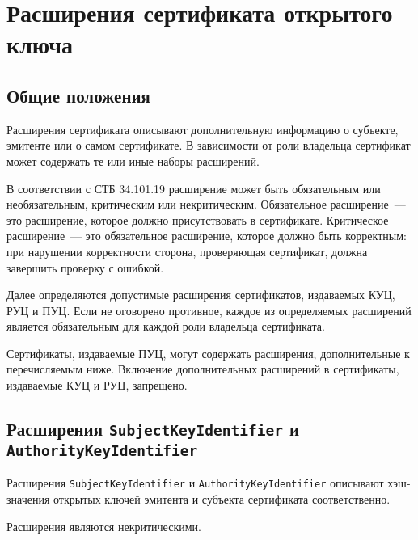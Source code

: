\section{Расширения сертификата открытого ключа}\label{FMT.Ext}

\subsection{Общие положения}\label{FMT.Ext.Intro} 

Расширения сертификата описывают дополнительную информацию о субъекте,
эмитенте или о самом сертификате. В зависимости от роли владельца 
сертификат может содержать те или иные наборы расширений.

В соответствии с СТБ 34.101.19 расширение может быть обязательным или 
необязательным, критическим или некритическим. 
Обязательное расширение~--- это расширение, которое должно присутствовать 
в сертификате.  Критическое расширение~--- это обязательное  
расширение, которое должно быть корректным: при нарушении корректности
сторона, проверяющая сертификат, должна завершить проверку с ошибкой.

Далее определяются допустимые расширения сертификатов, издаваемых КУЦ, РУЦ и ПУЦ. 
Если не оговорено противное, каждое из определяемых расширений является 
обязательным для каждой роли владельца сертификата. 

Сертификаты, издаваемые ПУЦ, могут содержать расширения, 
дополнительные к перечисляемым ниже. Включение дополнительных расширений в 
сертификаты, издаваемые КУЦ и РУЦ, запрещено.


\subsection{Расширения \texttt{SubjectKeyIdentifier} и 
\texttt{AuthorityKeyIdentifier}}\label{FMT.Ext.SKID} 

Расширения \texttt{SubjectKeyIdentifier} и \texttt{AuthorityKeyIdentifier} 
описывают хэш-значения открытых ключей эмитента и субъекта сертификата 
соответственно. 

 Расширения являются некритическими. 
 
